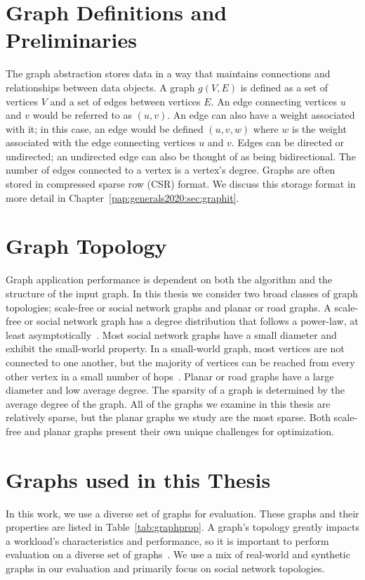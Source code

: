 \section{Graph Definitions and Preliminaries}\label{thesis:background:graphproc}
The graph abstraction stores data in a way that maintains connections and relationships between data objects.
A graph $g(V,E)$ is defined as a set of vertices $V$ and a set of edges between vertices $E$. 
An edge connecting vertices $u$ and $v$ would be referred to as $(u,v)$.
An edge can also have a weight associated with it; in this case, an edge would be defined $(u,v,w)$ where $w$ is the weight associated with the edge connecting vertices $u$ and $v$. 
Edges can be directed or undirected; an undirected edge can also be thought of as being bidirectional.
The number of edges connected to a vertex is a vertex's degree.
Graphs are often stored in compressed sparse row (CSR) format. 
We discuss this storage format in more detail in Chapter~\ref{pap:generals2020:sec:graphit}.

\section{Graph Topology}\label{thesis:background:topology}
Graph application performance is dependent on both the algorithm and the structure of the input graph.
In this thesis we consider two broad classes of graph topologies; scale-free or social network graphs and planar or road graphs.
A scale-free or social network graph has a degree distribution that follows a power-law, at least asymptotically~\cite{barabasi1999emergence}.
Most social network graphs have a small diameter and exhibit the small-world property. 
In a small-world graph, most vertices are not connected to one another, but the majority of vertices can be reached from every other vertex in a small number of hops~\cite{watts1998collective}.
Planar or road graphs have a large diameter and low average degree.
The sparsity of a graph is determined by the average degree of the graph.
All of the graphs we examine in this thesis are relatively sparse, but the planar graphs we study are the most sparse.
Both scale-free and planar graphs present their own unique challenges for optimization.

\section{Graphs used in this Thesis}\label{thesis:background:graphs}
In this work, we use a diverse set of graphs for evaluation.
These graphs and their properties are listed in Table~\ref{tab:graphprop}.
A graph's topology greatly impacts a workload's characteristics and performance, so it is important to perform evaluation on a diverse set of graphs~\cite{beamer2015locality}.
We use a mix of real-world and synthetic graphs in our evaluation and primarily focus on social network topologies. 

